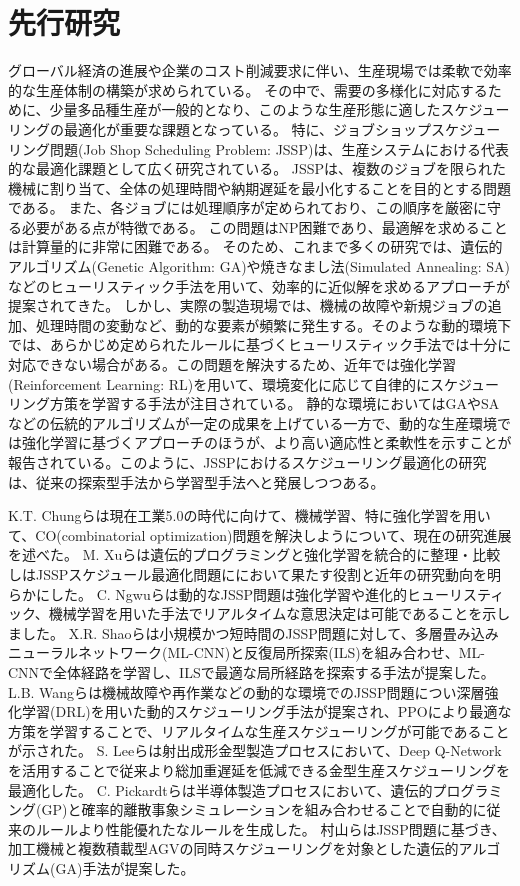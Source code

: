 \documentclass{jarticle}
\begin{document}
\section{先行研究}
グローバル経済の進展や企業のコスト削減要求に伴い、生産現場では柔軟で効率的な生産体制の構築が求められている。
その中で、需要の多様化に対応するために、少量多品種生産が一般的となり、このような生産形態に適したスケジューリングの最適化が重要な課題となっている。
特に、ジョブショップスケジューリング問題(Job Shop Scheduling Problem: JSSP)は、生産システムにおける代表的な最適化課題として広く研究されている。
JSSPは、複数のジョブを限られた機械に割り当て、全体の処理時間や納期遅延を最小化することを目的とする問題である。
また、各ジョブには処理順序が定められており、この順序を厳密に守る必要がある点が特徴である。
この問題はNP困難であり、最適解を求めることは計算量的に非常に困難である。
そのため、これまで多くの研究では、遺伝的アルゴリズム(Genetic Algorithm: GA)や焼きなまし法(Simulated Annealing: SA)などのヒューリスティック手法を用いて、効率的に近似解を求めるアプローチが提案されてきた。
しかし、実際の製造現場では、機械の故障や新規ジョブの追加、処理時間の変動など、動的な要素が頻繁に発生する。そのような動的環境下では、あらかじめ定められたルールに基づくヒューリスティック手法では十分に対応できない場合がある。この問題を解決するため、近年では強化学習(Reinforcement Learning: RL)を用いて、環境変化に応じて自律的にスケジューリング方策を学習する手法が注目されている。
静的な環境においてはGAやSAなどの伝統的アルゴリズムが一定の成果を上げている一方で、動的な生産環境では強化学習に基づくアプローチのほうが、より高い適応性と柔軟性を示すことが報告されている。このように、JSSPにおけるスケジューリング最適化の研究は、従来の探索型手法から学習型手法へと発展しつつある。

K.T. Chungら\cite{ref1}は現在工業5.0の時代に向けて、機械学習、特に強化学習を用いて、CO(combinatorial optimization)問題を解決しようについて、現在の研究進展を述べた。
M. Xuら\cite{ref2}は遺伝的プログラミングと強化学習を統合的に整理・比較しはJSSPスケジュール最適化問題ににおいて果たす役割と近年の研究動向を明らかにした。
C. Ngwuら\cite{ref3}は動的なJSSP問題は強化学習や進化的ヒューリスティック、機械学習を用いた手法でリアルタイムな意思決定は可能であることを示しました。
X.R. Shaoら\cite{ref4}は小規模かつ短時間のJSSP問題に対して、多層畳み込みニューラルネットワーク(ML-CNN)と反復局所探索(ILS)を組み合わせ、ML-CNNで全体経路を学習し、ILSで最適な局所経路を探索する手法が提案した。
L.B. Wangら\cite{ref5}は機械故障や再作業などの動的な環境でのJSSP問題につい深層強化学習(DRL)を用いた動的スケジューリング手法が提案され、PPOにより最適な方策を学習することで、リアルタイムな生産スケジューリングが可能であることが示された。
S. Leeら\cite{ref6}は射出成形金型製造プロセスにおいて、Deep Q-Networkを活用することで従来より総加重遅延を低減できる金型生産スケジューリングを最適化した。
C. Pickardtら\cite{ref7}は半導体製造プロセスにおいて、遺伝的プログラミング(GP)と確率的離散事象シミュレーションを組み合わせることで自動的に従来のルールより性能優れたなルールを生成した。
村山ら\cite{ref8}はJSSP問題に基づき、加工機械と複数積載型AGVの同時スケジューリングを対象とした遺伝的アルゴリズム(GA)手法が提案した。
\end{document}
